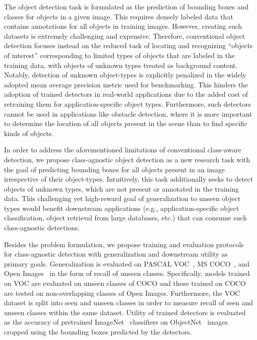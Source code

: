 \documentclass[10pt,twocolumn,letterpaper]{article}
\begin{document}
The object detection task is formulated as the prediction of bounding boxes and classes for objects in a given image. This requires densely labeled data that contains annotations for all objects in training images. However, creating such datasets is extremely challenging and expensive. Therefore, conventional object detection focuses instead on the reduced task of locating and recognizing ``objects of interest'' corresponding to limited types of objects that are labeled in the training data, with objects of unknown types treated as background content. Notably, detection of unknown object-types is explicitly penalized in the widely adopted mean average precision metric used for benchmarking. This hinders the adoption of trained detectors in real-world applications due to the added cost of retraining them for application-specific object types. Furthermore, such detectors cannot be used in applications like obstacle detection, where it is more important to determine the location of all objects present in the scene than to find specific kinds of objects.

In order to address the aforementioned limitations of conventional class-aware detection, we propose class-agnostic object detection as a new research task with the goal of predicting bounding boxes for all objects present in an image irrespective of their object-types. Intuitively, this task additionally seeks to detect objects of unknown types, which are not present or annotated in the training data. This challenging yet high-reward goal of generalization to unseen object types would benefit downstream applications (e.g., application-specific object classification, object retrieval from large databases, etc.) that can consume such class-agnostic detections.

Besides the problem formulation, we propose training and evaluation protocols for class-agnostic detection with generalization and downstream utility as primary goals. Generalization is evaluated on PASCAL VOC~\cite{bib:voc}, MS COCO~\cite{bib:coco}, and Open Images~\cite{bib:oi} in the form of recall of unseen classes. Specifically, models trained on VOC are evaluated on unseen classes of COCO and those trained on COCO are tested on non-overlapping classes of Open Images. Furthermore, the VOC dataset is split into seen and unseen classes in order to measure recall of seen and unseen classes within the same dataset. Utility of trained detectors is evaluated as the accuracy of pretrained ImageNet~\cite{bib:imagenet} classifiers on ObjectNet~\cite{bib:objectnet} images cropped using the bounding boxes predicted by the detectors.
\end{document}

